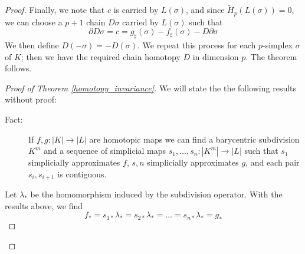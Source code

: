\documentclass[toc=bib]{scrartcl}
\theoremstyle{plain}
\theoremstyle{definition}
\theoremstyle{remark}
\begin{document}
\begin{proof}
	Finally, we note that $c$ is carried by $L(\sigma)$, and since $\tilde{H}_p(L(\sigma))=0$, we can choose a $p+1$ chain $D\sigma$ carried by $L(\sigma)$ such that 
	\[
	\partial D\sigma=c=g_\sharp(\sigma)-f_\sharp(\sigma)-D\partial\sigma
	\]
	We then define $D(-\sigma)=-D(\sigma)$. We repeat this process for each $p$-simplex $\sigma$ of $K$; then we have the required chain homotopy $D$ in dimension $p$. The theorem follows.
	
	
	
	\begin{proof}[Proof of Theorem \ref{homotopy_invariance}]
		We will state the the following results without proof:
		\begin{description}
			\item[Fact:] If $f,g:|K|\to |L|$ are homotopic maps we can find a barycentric subdivision $K^m$ and a sequence of simplicial maps $s_1,\dots,s_n:|K^m|\to|L|$ such that $s_1$ simplicially approximates $f$, $s,n$ simplicially approximates $g$, and each pair $s_i,s_{i+1}$ is contiguous.
		\end{description}
		Let $\lambda_\ast$ be the homomorphism induced by the subdivision operator. With the results above, we find
		\[
		f_\ast=s_{1\ast}\lambda_\ast=s_{2\ast}\lambda_\ast=\dots=s_{n\ast}\lambda_\ast=g_\ast
		\]
	\end{proof}
	
\end{proof}



\printbibliography
\end{document}
